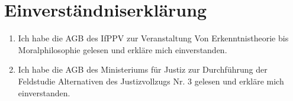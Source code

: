 \documentclass[a4paper, 12pt]{scrartcl}
\begin{document}
  \section{Einverst\"andniserkl\"arung}

    \beg

    \begin{enumerate}
        \item Ich habe die AGB des IfPPV zur Veranstaltung {\dq}Von Erkenntnistheorie bis Moralphilosophie{\dq} gelesen und erkl\"are mich einverstanden.
        \item Ich habe die AGB des Ministeriums f\"ur Justiz zur Durchf\"uhrung der Feldstudie {\dq}Alternativen des Justizvollzugs{\dq} Nr. 3 gelesen und erkl\"are mich einverstanden.
    \end{enumerate}
\end{document}
